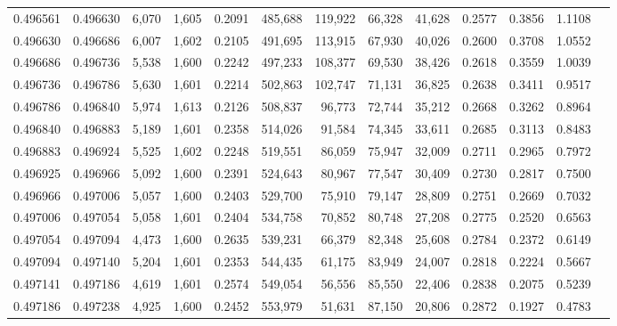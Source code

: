\begin{tabular}{rrrrrrrrrrrrr}
0.496561 & 0.496630 &  6,070 & 1,605 &                                     0.2091 & 485,688 & 119,922 &  66,328 &  41,628 & 0.2577 & 0.3856 & 1.1108 \\
0.496630 & 0.496686 &  6,007 & 1,602 &                                     0.2105 & 491,695 & 113,915 &  67,930 &  40,026 & 0.2600 & 0.3708 & 1.0552 \\
0.496686 & 0.496736 &  5,538 & 1,600 &                                     0.2242 & 497,233 & 108,377 &  69,530 &  38,426 & 0.2618 & 0.3559 & 1.0039 \\
0.496736 & 0.496786 &  5,630 & 1,601 &                                     0.2214 & 502,863 & 102,747 &  71,131 &  36,825 & 0.2638 & 0.3411 & 0.9517 \\
0.496786 & 0.496840 &  5,974 & 1,613 &                                     0.2126 & 508,837 &  96,773 &  72,744 &  35,212 & 0.2668 & 0.3262 & 0.8964 \\
0.496840 & 0.496883 &  5,189 & 1,601 &                                     0.2358 & 514,026 &  91,584 &  74,345 &  33,611 & 0.2685 & 0.3113 & 0.8483 \\
0.496883 & 0.496924 &  5,525 & 1,602 &                                     0.2248 & 519,551 &  86,059 &  75,947 &  32,009 & 0.2711 & 0.2965 & 0.7972 \\
0.496925 & 0.496966 &  5,092 & 1,600 &                                     0.2391 & 524,643 &  80,967 &  77,547 &  30,409 & 0.2730 & 0.2817 & 0.7500 \\
0.496966 & 0.497006 &  5,057 & 1,600 &                                     0.2403 & 529,700 &  75,910 &  79,147 &  28,809 & 0.2751 & 0.2669 & 0.7032 \\
0.497006 & 0.497054 &  5,058 & 1,601 &                                     0.2404 & 534,758 &  70,852 &  80,748 &  27,208 & 0.2775 & 0.2520 & 0.6563 \\
0.497054 & 0.497094 &  4,473 & 1,600 &                                     0.2635 & 539,231 &  66,379 &  82,348 &  25,608 & 0.2784 & 0.2372 & 0.6149 \\
0.497094 & 0.497140 &  5,204 & 1,601 &                                     0.2353 & 544,435 &  61,175 &  83,949 &  24,007 & 0.2818 & 0.2224 & 0.5667 \\
0.497141 & 0.497186 &  4,619 & 1,601 &                                     0.2574 & 549,054 &  56,556 &  85,550 &  22,406 & 0.2838 & 0.2075 & 0.5239 \\
0.497186 & 0.497238 &  4,925 & 1,600 &                                     0.2452 & 553,979 &  51,631 &  87,150 &  20,806 & 0.2872 & 0.1927 & 0.4783 \\

\end{tabular}

